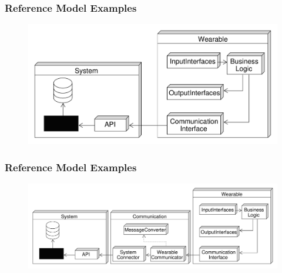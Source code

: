 \begin{frame}\frametitle{Reference Model Examples}
	\begin{figure}
		\includegraphics[width=\textwidth]{images/ReferenceModel_NoCommunication}
	\end{figure}
\end{frame}
\begin{frame}\frametitle{Reference Model Examples}
	\begin{figure}
		\includegraphics[width=\textwidth]{images/ReferenceModel_Converter}
	\end{figure}
\end{frame}